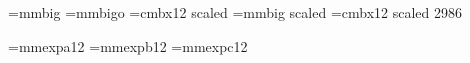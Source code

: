 


\font\bigmmf=mmbig                              %
\font\bigmmof=mmbigo                                    %
\font\bigrm=cmbx12 scaled 
\font\hugemmf=mmbig scaled     %
\font\hugerm=cmbx12 scaled 2986 %

\def\bigmmr{\let\mmcurf=\bigmmf\let\mmcursf=\mmsf\let\mmcurrm=\bigrm
  \mmcbls=28pt\ifmmmode\setmm\fi}
\def\bigmmo{\let\mmcurf=\bigmmof\let\mmcursf=\mmsf\let\mmcurrm=\bigrm
  \mmcbls=28pt\ifmmmode\setmm\fi}
\def\hugemmr{\let\mmcurf=\hugemmf\let\mmcursf=\mmsf\let\mmcurrm=\hugerm
  \mmcbls=48pt\ifmmmode\setmm\fi}


\font\mmxa=mmexpa12                             %
\font\mmxb=mmexpb12                             %
\font\mmxc=mmexpc12                             %

\def\xamm{\let\mmcurf=\mmxa\let\mmcursf=\mmsf\let\mmcurrm=\twelverm
  \mmcbls=15.6pt\ifmmmode\setmm\fi}
\def\xbmm{\let\mmcurf=\mmxb\let\mmcursf=\mmsf\let\mmcurrm=\twelverm
  \mmcbls=15.6pt\ifmmmode\setmm\fi}
\def\xcmm{\let\mmcurf=\mmxc\let\mmcursf=\mmsf\let\mmcurrm=\twelverm
  \mmcbls=15.6pt\ifmmmode\setmm\fi}

